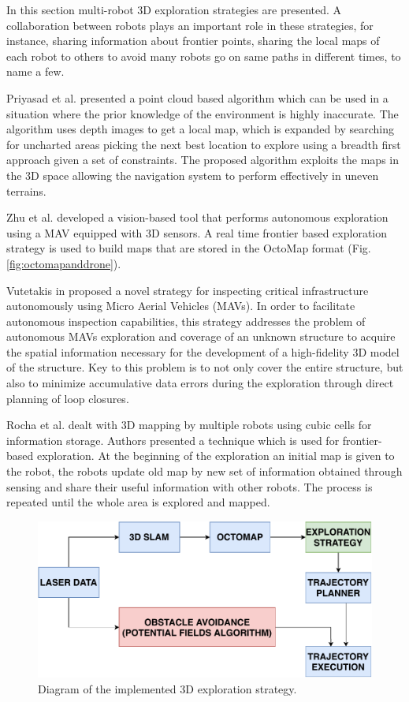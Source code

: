 In this section multi-robot 3D exploration strategies are presented. A collaboration between robots plays an important role in these strategies, for instance, sharing information about frontier points, sharing the local maps of each robot to others to avoid many robots go on same paths in different times, to name a few.

Priyasad et al. \cite{Priyasad2018} presented a point cloud based algorithm which can be used in a situation where the prior knowledge of the environment is highly inaccurate. The algorithm uses depth images to get a local map, which is expanded by searching for uncharted areas picking the next best
location to explore using a breadth first approach given a set of
constraints. The proposed algorithm exploits the maps in the 3D
space allowing the navigation system to perform effectively in uneven terrains. 

Zhu et al. \cite{Zhu2015} developed a vision-based tool that performs autonomous exploration using a MAV equipped with 3D sensors. A real time frontier based exploration strategy is used to build maps that are stored in the OctoMap format (Fig. \ref{fig:octomapanddrone}).

Vutetakis in \cite{Vutetakis2019} proposed a novel strategy for inspecting critical infrastructure autonomously using Micro Aerial Vehicles (MAVs). In order to facilitate autonomous inspection capabilities, this strategy addresses the problem of autonomous MAVs exploration and coverage of an unknown structure to acquire the spatial information necessary for the development of a high-fidelity 3D model of the structure. Key to this problem is to not only cover the entire structure, but also to minimize accumulative data errors during the exploration through direct planning of loop closures. 

Rocha et al. \cite{Rocha2005} dealt with 3D mapping by multiple robots using cubic cells for information storage. Authors presented a technique which is used for frontier-based exploration. At the beginning of the exploration an initial map is given to the robot, the robots update old map by new set of information obtained through sensing and share their useful information with other robots. The process is repeated until the whole area is explored and mapped.


\begin{figure}[t!]
	\centering
	\includegraphics[width=1.0\columnwidth]{./pictures/3D_strategy.pdf}	
	\caption{Diagram of the implemented 3D exploration strategy.}
	\label{fig:3D_strategy}
\end{figure}

